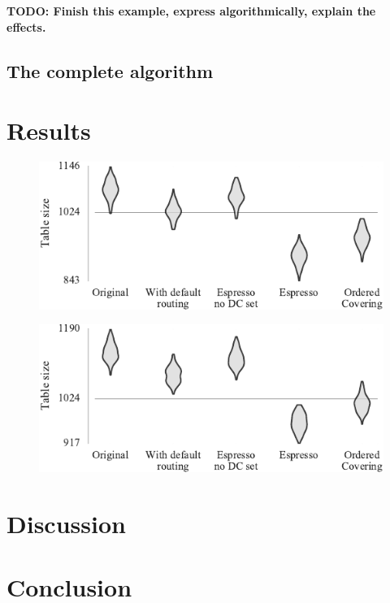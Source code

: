 \documentclass[conference]{IEEEtran}
\begin{document}
  \textbf{TODO: Finish this example, express algorithmically, explain the effects.}

  \subsection{The complete algorithm}

  \section{Results}

\begin{figure}
  \centering
  \includegraphics{experiments/results_gaussian}
\end{figure}

\begin{figure}
  \centering
  \includegraphics{experiments/results_centroid}
\end{figure}

  \section{Discussion}

  \section{Conclusion}
\printbibliography
\end{document}
